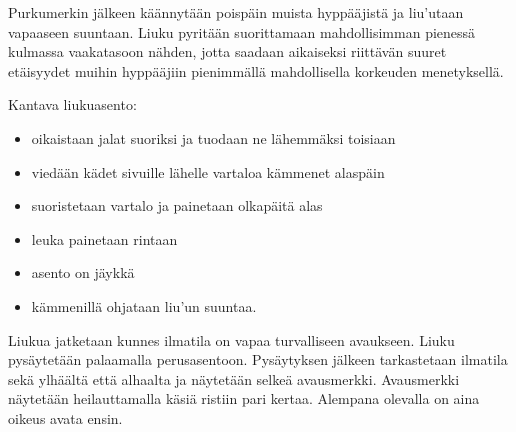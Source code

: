 Purkumerkin jälkeen käännytään poispäin muista hyppääjistä ja liu'utaan vapaaseen suuntaan. Liuku pyritään suorittamaan mahdollisimman pienessä kulmassa vaakatasoon nähden, jotta saadaan aikaiseksi riittävän suuret etäisyydet muihin hyppääjiin pienimmällä mahdollisella korkeuden menetyksellä. 


Kantava liukuasento: 

\begin{itemize}
\item  oikaistaan jalat suoriksi ja tuodaan ne lähemmäksi toisiaan  
\item  viedään kädet sivuille lähelle vartaloa kämmenet alaspäin  
\item  suoristetaan vartalo ja painetaan olkapäitä alas  
\item  leuka painetaan rintaan  
\item  asento on jäykkä  
\item  kämmenillä ohjataan liu'un suuntaa.  
\end{itemize}

Liukua jatketaan kunnes ilmatila on vapaa turvalliseen avaukseen. Liuku pysäytetään palaamalla perusasentoon. Pysäytyksen jälkeen tarkastetaan ilmatila sekä ylhäältä että alhaalta ja näytetään selkeä avausmerkki. Avausmerkki näytetään heilauttamalla käsiä ristiin pari kertaa. Alempana olevalla on aina oikeus avata ensin. 

